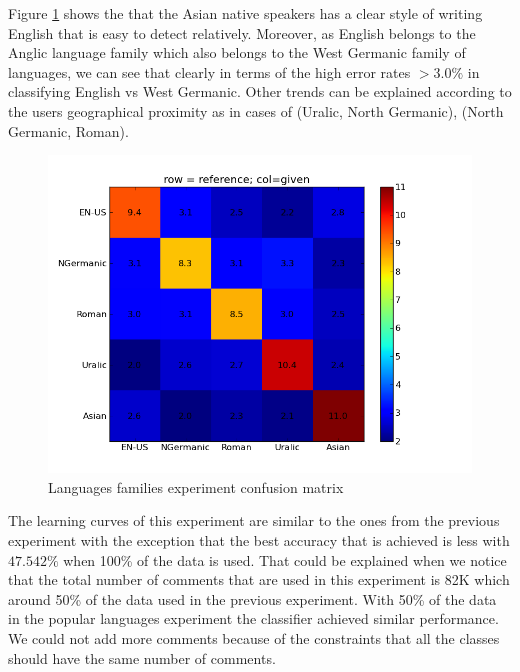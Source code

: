 \documentclass[11pt]{article}
\begin{document}
Figure \ref{fam_cfm} shows the that the Asian native speakers has a clear style of writing English that is easy to detect relatively. Moreover, as English belongs to the Anglic language family which also belongs to the West Germanic family of languages, we can see that clearly in terms of the high error rates $>3.0\%$ in classifying English vs West Germanic. Other trends can be explained according to the users geographical proximity as in cases of (Uralic, North Germanic), (North Germanic, Roman).

\begin{figure}[htp]
\centering
\includegraphics[scale=0.45]{family_cfm.png}
\caption{Languages families experiment confusion matrix}
\label{fam_cfm}
\end{figure}

The learning curves of this experiment are similar to the ones from the previous experiment with the exception that the best accuracy that is achieved is less with $47.542\%$ when 100\% of the data is used. That could be explained when we notice that the total number of comments that are used in this experiment is 82K which around 50\% of the data used in the previous experiment. With 50\% of the data in the popular languages experiment the classifier achieved similar performance. We could not add more comments because of the constraints that all the classes should have the same number of comments.
\end{document}
